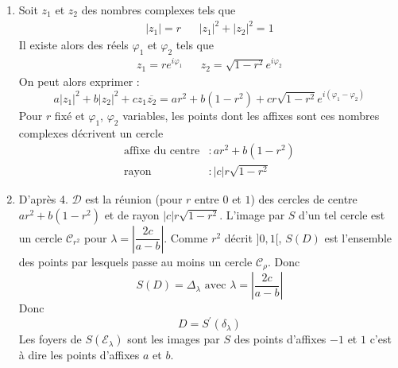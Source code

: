 \begin{enumerate}
\item Soit $z_1$ et $z_2$ des nombres complexes tels que 
\begin{align*}
 |z_1| = r & & |z_1|^2 + |z_2|^2 = 1
\end{align*}
Il existe alors des réels $\varphi_1$ et $\varphi_2$ tels que 
\begin{align*}
 z_1 = re^{i\varphi_1} & & z_2 = \sqrt{1-r^2}e^{i\varphi_2} 
\end{align*}
On peut alors exprimer : 
\begin{displaymath}
 a|z_1|^2 + b|z_2|^2 +cz_1\overline{z_2} = 
ar^2 + b(1-r^2) + cr\sqrt{1-r^2}e^{i(\varphi_1 - \varphi_2)}
\end{displaymath}
Pour $r$ fixé et $\varphi_1$, $\varphi_2$ variables, les points dont les affixes sont ces nombres complexes décrivent un cercle
\begin{align*}
 \text{affixe du centre}  &:  ar^2  + b(1-r^2) \\ 
\text{rayon} &: |c|r\sqrt{1-r^2}
\end{align*}

\item D'après 4. $\mathcal D$ est la réunion (pour $r$ entre $0$ et $1$) des cercles de centre $ar^2  + b(1-r^2)$ et de rayon $|c|r\sqrt{1-r^2}$.\newline
L'image par $S$ d'un tel cercle est un cercle $\mathcal C_{r^2}$ pour $\lambda = \left\vert \dfrac{2c}{a-b}\right \vert$. Comme $r^2$ décrit $]0,1[$, $S(D)$ est l'ensemble des points par lesquels passe au moins un cercle $\mathcal C_\rho$. Donc
\begin{displaymath}
 S(D) = \Delta_\lambda \text{ avec } \lambda = \left\vert \dfrac{2c}{a-b}\right \vert
\end{displaymath}
Donc
\begin{displaymath}
 D = S^\prime (\delta_\lambda)
\end{displaymath}
Les foyers de $S(\mathcal E_\lambda)$ sont les images par $S$ des points d'affixes $-1$ et $1$ c'est à dire les points d'affixes $a$ et $b$.
\end{enumerate}
